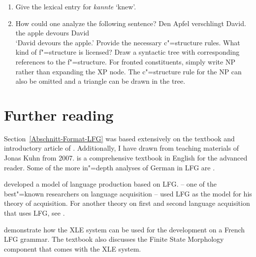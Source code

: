 \begin{enumerate}
\item Give the lexical entry for \emph{kannte} `knew'.
\item How could one analyze the following sentence?
\ea
\gll Den Apfel verschlingt David.\\
	 the apple devours David\\
\glt `David devours the apple.'
\z
Provide the necessary c"=structure rules. What kind of f"=structure is licensed?
Draw a syntactic tree with corresponding references to the f"=structure. For fronted constituents,
simply write NP rather than expanding the XP node.
The c"=structure rule for the NP can also be omitted and a triangle can be drawn in the tree.
\end{enumerate}


\section*{Further reading}


Section~\ref{Abschnitt-Format-LFG} was based extensively on the textbook and introductory article of \citet{Dalrymple2001a-u,Dalrymple2006a}. Additionally, I have drawn from
teaching materials of Jonas Kuhn from 2007.  is a comprehensive textbook in English for the advanced reader. Some of the more in"=depth analyses of
German in LFG are .  

\citet{Levelt89a} developed a model of language production based on LFG.
 \citet{Pinker84a-u} -- one of the best"=known researchers on language acquisition -- used LFG as the model for his theory of acquisition. For another theory on first and second
 language acquisition that uses LFG, see . 

\citet{SdA2015a-u} demonstrate how the XLE system can be used for the development on a
French LFG grammar. The textbook also discusses the Finite State Morphology component that comes
with the XLE system.


